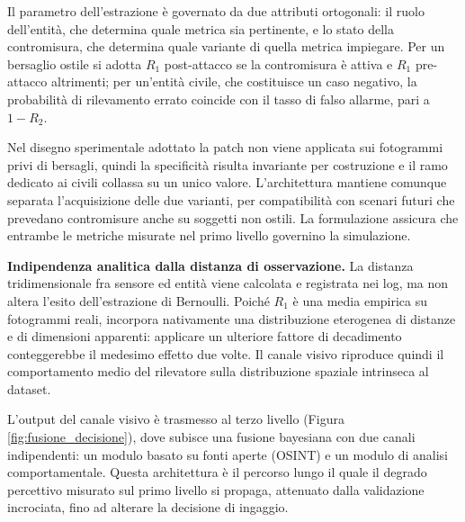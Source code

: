\documentclass[a4paper,12pt]{report}
\begin{document}
Il parametro dell'estrazione è governato da due attributi ortogonali: il ruolo
dell'entità, che determina quale metrica sia pertinente, e lo stato della
contromisura, che determina quale variante di quella metrica impiegare. Per un
bersaglio ostile si adotta $R_1$ post-attacco se la contromisura è attiva e
$R_1$ pre-attacco altrimenti; per un'entità civile, che costituisce un caso
negativo, la probabilità di rilevamento errato coincide con il tasso di falso
allarme, pari a $1 - R_2$.

Nel disegno sperimentale adottato la patch non viene applicata sui fotogrammi
privi di bersagli, quindi la specificità risulta invariante per costruzione e il
ramo dedicato ai civili collassa su un unico valore. L'architettura mantiene
comunque separata l'acquisizione delle due varianti, per compatibilità con
scenari futuri che prevedano contromisure anche su soggetti non ostili. La
formulazione assicura che entrambe le metriche misurate nel primo livello
governino la simulazione.

\textbf{Indipendenza analitica dalla distanza di osservazione.}
La distanza tridimensionale fra sensore ed entità viene calcolata e registrata
nei log, ma non altera l'esito dell'estrazione di Bernoulli. Poiché $R_1$ è una
media empirica su fotogrammi reali, incorpora nativamente una distribuzione
eterogenea di distanze e di dimensioni apparenti: applicare un ulteriore fattore
di decadimento conteggerebbe il medesimo effetto due volte. Il canale visivo
riproduce quindi il comportamento medio del rilevatore sulla distribuzione
spaziale intrinseca al dataset.

L'output del canale visivo è trasmesso al terzo livello (Figura
\ref{fig:fusione_decisione}), dove subisce una fusione bayesiana con due canali
indipendenti: un modulo basato su fonti aperte (OSINT) e un modulo di analisi
comportamentale. Questa architettura è il percorso lungo il quale il degrado
percettivo misurato sul primo livello si propaga, attenuato dalla validazione
incrociata, fino ad alterare la decisione di ingaggio.
\end{document}

